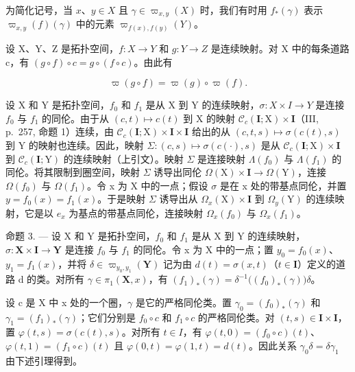 为简化记号，当 \(x\)、\(y \in X\) 且 \(\gamma \in \varpi_{x,y}(X)\) 时，我们有时用 \(f_{*}(\gamma)\) 表示 \(\varpi_{x,y}(f)(\gamma)\) 中的元素 \(\varpi_{f(x),f(y)}(Y)\)。

设 X、Y、Z 是拓扑空间，\(f: X \to Y\) 和 \(g: Y \to Z\) 是连续映射。对 X 中的每条道路 c，有 \((g \circ f) \circ c = g \circ (f \circ c)\)。由此有

\[
\varpi (g \circ f) = \varpi (g) \circ \varpi (f).
\]

设 X 和 Y 是拓扑空间，\(f_{0}\) 和 \(f_{1}\) 是从 X 到 Y 的连续映射，\(\sigma\colon X\times I\to Y\) 是连接 \(f_{0}\) 与 \(f_{1}\) 的同伦。由于从 \((c,t)\mapsto c(t)\) 到 X 的映射 \(\mathcal{C}_{c}(\mathbf{I};\mathrm{X})\times\mathbf{I}\)（III, p.~257, 命题 1）连续，由 \(\mathcal{C}_{c}(\mathbf{I};\mathrm{X})\times\mathbf{I}\times\mathbf{I}\) 给出的从 \((c,t,s)\mapsto\sigma(c(t),s)\) 到 Y 的映射也连续。因此，映射 \(\Sigma\colon(c,s)\mapsto\sigma(c(\cdot),s)\) 是从 \(\mathcal{C}_{c}(\mathbf{I};\mathrm{X})\times\mathbf{I}\) 到 \(\mathcal{C}_{c}(\mathbf{I};\mathrm{Y})\) 的连续映射（上引文）。映射 \(\Sigma\) 是连接映射 \(\Lambda(f_{0})\) 与 \(\Lambda(f_{1})\) 的同伦。将其限制到圈空间，映射 \(\Sigma\) 诱导出同伦 \(\Omega(\mathrm{X})\times\mathbf{I}\to\Omega(\mathrm{Y})\)，连接 \(\Omega(f_{0})\) 与 \(\Omega(f_{1})\)。令 x 为 X 中的一点；假设 \(\sigma\) 是在 x 处的带基点同伦，并置 \(y=f_{0}(x)=f_{1}(x)\)。于是映射 \(\Sigma\) 诱导出从 \(\Omega_{x}(\mathrm{X})\times\mathbf{I}\) 到 \(\Omega_{y}(\mathrm{Y})\) 的连续映射，它是以 \(e_{x}\) 为基点的带基点同伦，连接映射 \(\Omega_{x}(f_{0})\) 与 \(\Omega_{x}(f_{1})\)。

命题 3. --- 设 X 和 Y 是拓扑空间，\(f_{0}\) 和 \(f_{1}\) 是从 X 到 Y 的连续映射，\(\sigma\colon\mathbf{X}\times\mathbf{I}\to\mathbf{Y}\) 是连接 \(f_{0}\) 与 \(f_{1}\) 的同伦。令 x 为 X 中的一点；置 \(y_{0}=f_{0}(x)\)、\(y_{1}=f_{1}(x)\)，并将 \(\delta\in\varpi_{y_{0},y_{1}}(\mathbf{Y})\) 记为由 \(d(t)=\sigma(x,t)\)（\(t\in\mathbf{I}\)）定义的道路 d 的类。对所有 \(\gamma\in\pi_{1}(\mathbf{X},x)\)，有 \((f_{1})_{*}(\gamma)=\delta^{-1}\big((f_{0})_{*}(\gamma)\big)\delta\)。

设 c 是 X 中 x 处的一个圈，\(\gamma\) 是它的严格同伦类。置 \(\gamma_{0} = (f_{0})_{*}(\gamma)\) 和 \(\gamma_{1} = (f_{1})_{*}(\gamma)\)；它们分别是 \(f_{0} \circ c\) 和 \(f_{1} \circ c\) 的严格同伦类。对 \((t, s) \in \mathbf{I} \times \mathbf{I}\)，置 \(\varphi(t, s) = \sigma(c(t), s)\)。对所有 \(t \in I\)，有 \(\varphi(t, 0) = (f_{0} \circ c)(t)\)、\(\varphi(t, 1) = (f_{1} \circ c)(t)\) 且 \(\varphi(0, t) = \varphi(1, t) = d(t)\)。因此关系 \(\gamma_{0}\delta = \delta\gamma_{1}\) 由下述引理得到。

